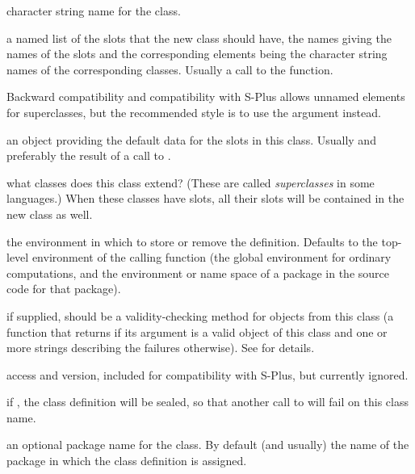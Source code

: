 \begin{Arguments}
\begin{ldescription}
\item[\code{Class}] character string name for the class.
\item[\code{representation}]  a named list of the slots that the new class should have, the names giving the names of the slots and the corresponding elements being the character string names of  the corresponding classes.
Usually a call to
the  function. 

Backward compatibility and compatibility with S-Plus allows unnamed
elements for superclasses, but the recommended style is to use the
 argument instead.
\item[\code{prototype}]  an object providing the default
data for the slots in this class.  Usually and preferably the
result of a call to . 
\item[\code{contains}]  what classes does this class extend?  (These are
called \emph{superclasses} in some languages.)  When these classes
have slots, all their slots will be contained in the new class as
well. 
\item[\code{where}]  the
environment in which to store or remove the
definition.  Defaults to the top-level environment of the calling function
(the global environment for ordinary computations, and the
environment or name space of a package in the source code for that package).

\item[\code{validity}]  if supplied, should be a validity-checking method
for objects from this class (a function that returns  if
its argument is a valid object of this class and one or more strings
describing the failures otherwise).  See 
for details.
\item[\code{access, version}] access and version, included for
compatibility with S-Plus, but currently ignored.
\item[\code{sealed}]  if , the class definition will be sealed,
so that another call to  will fail on this class name.

\item[\code{package}]  an optional package name for the class.  By default
(and usually) the name of the package in which the class definition is assigned.


\end{ldescription}
\end{Arguments}
